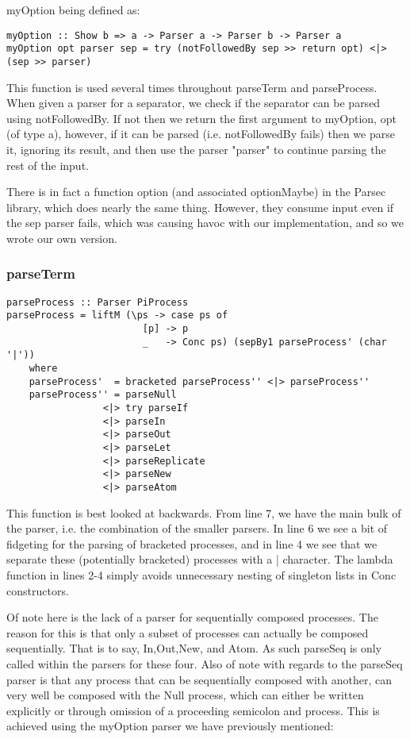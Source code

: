 myOption being defined as:

\begin{verbatim}
myOption :: Show b => a -> Parser a -> Parser b -> Parser a
myOption opt parser sep = try (notFollowedBy sep >> return opt) <|> (sep >> parser)
\end{verbatim}

This function is used several times throughout parseTerm and parseProcess. When given a parser for a separator, we check if the separator can be parsed using notFollowedBy. If not then we return the first argument to myOption, opt (of type a), however, if it can be parsed (i.e. notFollowedBy fails) then we parse it, ignoring its result, and then use the parser "parser" to continue parsing the rest of the input.

There is in fact a function option (and associated optionMaybe) in the Parsec library, which does nearly the same thing. However, they consume input even if the sep parser fails, which was causing havoc with our implementation, and so we wrote our own version.

\subsubsection{parseTerm}
\begin{verbatim}
parseProcess :: Parser PiProcess
parseProcess = liftM (\ps -> case ps of 
                        [p] -> p
                        _   -> Conc ps) (sepBy1 parseProcess' (char '|'))
    where
    parseProcess'  = bracketed parseProcess'' <|> parseProcess''
    parseProcess'' = parseNull 
                 <|> try parseIf
                 <|> parseIn 
                 <|> parseOut
                 <|> parseLet
                 <|> parseReplicate
                 <|> parseNew
                 <|> parseAtom
\end{verbatim}

This function is best looked at backwards. From line 7, we have the main bulk of the parser, i.e. the combination of the smaller parsers. In line 6 we see a bit of fidgeting for the parsing of bracketed processes, and in line 4 we see that we separate these (potentially bracketed) processes with a | character. The lambda function in lines 2-4 simply avoids unnecessary nesting of singleton lists in Conc constructors. 

Of note here is the lack of a parser for sequentially composed processes. The reason for this is that only a subset of processes can actually be composed sequentially. That is to say, In,Out,New, and Atom. As such parseSeq is only called within the parsers for these four. Also of note with regards to the parseSeq parser is that any process that can be sequentially composed with another, can very well be composed with the Null process, which can either be written explicitly
or through omission of a proceeding semicolon and process. This is achieved using the myOption parser we have previously mentioned:

